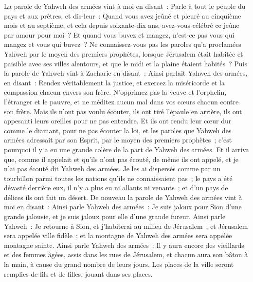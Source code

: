 \begin{multicols}{2}
La parole de Yahweh des armées vint à moi en disant~:
Parle à tout le peuple du pays et aux prêtres, et dis-leur~: Quand vous avez jeûné et pleuré au cinquième mois et au septième, et cela depuis soixante-dix ans, avez-vous célébré ce jeûne par amour pour moi~?
Et quand vous buvez et mangez, n'est-ce pas vous qui mangez et vous qui buvez~?
Ne connaissez-vous pas les paroles qu'a proclamées Yahweh par le moyen des premiers prophètes, lorsque Jérusalem était habitée et paisible avec ses villes alentours, et que le midi et la plaine étaient habités~?
Puis la parole de Yahweh vint à Zacharie en disant~:
Ainsi parlait Yahweh des armées, en disant~: Rendez véritablement la justice, et exercez la miséricorde et la compassion chacun envers son frère.
N'opprimez pas la veuve et l'orphelin, l'étranger et le pauvre, et ne méditez aucun mal dans vos cœurs chacun contre son frère.
Mais ils n'ont pas voulu écouter, ils ont tiré l'épaule en arrière, ils ont appesanti leurs oreilles pour ne pas entendre.
Et ils ont rendu leur cœur dur comme le diamant, pour ne pas écouter la loi, et les paroles que Yahweh des armées adressait par son Esprit, par le moyen des premiers prophètes~; c'est pourquoi il y a eu une grande colère de la part de Yahweh des armées.
Et il arriva que, comme il appelait et qu'ils n'ont pas écouté, de même ils ont appelé, et je n'ai pas écouté dit Yahweh des armées.
Je les ai dispersés comme par un tourbillon parmi toutes les nations qu'ils ne connaissaient pas~; le pays a été dévasté derrière eux, il n'y a plus eu ni allants ni venants~; et d'un pays de délices ils ont fait un désert.
\VerseOne{}De nouveau la parole de Yahweh des armées vint à moi en disant~:
Ainsi parle Yahweh des armées~: Je suis jaloux pour Sion d'une grande jalousie, et je suis jaloux pour elle d'une grande fureur.
Ainsi parle Yahweh~: Je retourne à Sion, et j'habiterai au milieu de Jérusalem~; et Jérusalem sera appelée ville fidèle~; et la montagne de Yahweh des armées sera appelée montagne sainte.
Ainsi parle Yahweh des armées~: Il y aura encore des vieillards et des femmes âgées, assis dans les rues de Jérusalem, et chacun aura son bâton à la main, à cause du grand nombre de leurs jours.
Les places de la ville seront remplies de fils et de filles, jouant dans ses places.

\end{multicols}
